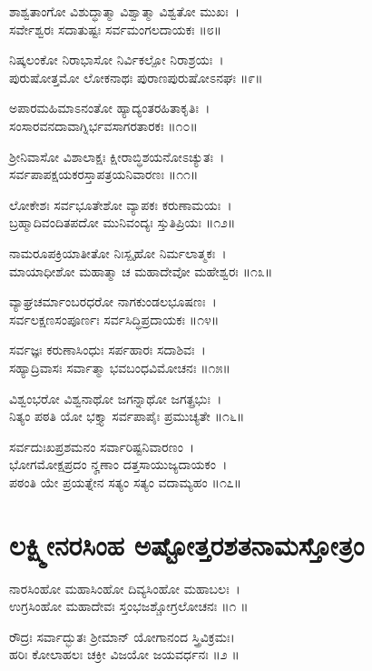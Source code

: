 ಶಾಶ್ವತಾಂಗೋ ವಿಶುದ್ಧಾತ್ಮಾ ವಿಶ್ವಾತ್ಮಾ ವಿಶ್ವತೋ ಮುಖಃ~।\\
ಸರ್ವೇಶ್ವರಃ ಸದಾತುಷ್ಟಃ ಸರ್ವಮಂಗಲದಾಯಕಃ ॥೮॥

ನಿಷ್ಕಲಂಕೋ ನಿರಾಭಾಸೋ ನಿರ್ವಿಕಲ್ಪೋ ನಿರಾಶ್ರಯಃ~।\\
ಪುರುಷೋತ್ತಮೋ ಲೋಕನಾಥಃ ಪುರಾಣಪುರುಷೋಽನಘಃ ॥೯॥

ಅಪಾರಮಹಿಮಾಽನಂತೋ ಹ್ಯಾದ್ಯಂತರಹಿತಾಕೃತಿಃ~।\\
ಸಂಸಾರವನದಾವಾಗ್ನಿರ್ಭವಸಾಗರತಾರಕಃ ॥೧೦॥

ಶ್ರೀನಿವಾಸೋ ವಿಶಾಲಾಕ್ಷಃ ಕ್ಷೀರಾಬ್ಧಿಶಯನೋಽಚ್ಯುತಃ~।\\
ಸರ್ವಪಾಪಕ್ಷಯಕರಸ್ತಾಪತ್ರಯನಿವಾರಣಃ ॥೧೧॥

ಲೋಕೇಶಃ ಸರ್ವಭೂತೇಶೋ ವ್ಯಾಪಕಃ ಕರುಣಾಮಯಃ~।\\
ಬ್ರಹ್ಮಾದಿವಂದಿತಪದೋ ಮುನಿವಂದ್ಯಃ ಸ್ತುತಿಪ್ರಿಯಃ ॥೧೨॥

ನಾಮರೂಪಕ್ರಿಯಾತೀತೋ ನಿಃಸ್ಪೃಹೋ ನಿರ್ಮಲಾತ್ಮಕಃ~।\\
ಮಾಯಾಧೀಶೋ ಮಹಾತ್ಮಾ ಚ ಮಹಾದೇವೋ ಮಹೇಶ್ವರಃ ॥೧೩॥

ವ್ಯಾಘ್ರಚರ್ಮಾಂಬರಧರೋ ನಾಗಕುಂಡಲಭೂಷಣಃ~।\\
ಸರ್ವಲಕ್ಷಣಸಂಪೂರ್ಣಃ ಸರ್ವಸಿದ್ಧಿಪ್ರದಾಯಕಃ ॥೧೪॥

ಸರ್ವಜ್ಞಃ ಕರುಣಾಸಿಂಧುಃ ಸರ್ಪಹಾರಃ ಸದಾಶಿವಃ~।\\
ಸಹ್ಯಾದ್ರಿವಾಸಃ ಸರ್ವಾತ್ಮಾ ಭವಬಂಧವಿಮೋಚನಃ ॥೧೫॥

ವಿಶ್ವಂಭರೋ ವಿಶ್ವನಾಥೋ ಜಗನ್ನಾಥೋ ಜಗತ್ಪ್ರಭುಃ~।\\
ನಿತ್ಯಂ ಪಠತಿ ಯೋ ಭಕ್ತ್ಯಾ ಸರ್ವಪಾಪೈಃ ಪ್ರಮುಚ್ಯತೇ ॥೧೬॥

ಸರ್ವದುಃಖಪ್ರಶಮನಂ ಸರ್ವಾರಿಷ್ಟನಿವಾರಣಂ~।\\
ಭೋಗಮೋಕ್ಷಪ್ರದಂ ನೄಣಾಂ ದತ್ತಸಾಯುಜ್ಯದಾಯಕಂ~।\\
ಪಠಂತಿ ಯೇ ಪ್ರಯತ್ನೇನ ಸತ್ಯಂ ಸತ್ಯಂ ವದಾಮ್ಯಹಂ ॥೧೭॥

\section{ಲಕ್ಷ್ಮೀನರಸಿಂಹ ಅಷ್ಟೋತ್ತರಶತನಾಮಸ್ತೋತ್ರಂ}

ನಾರಸಿಂಹೋ ಮಹಾಸಿಂಹೋ ದಿವ್ಯಸಿಂಹೋ ಮಹಾಬಲಃ~।\\
ಉಗ್ರಸಿಂಹೋ ಮಹಾದೇವಃ ಸ್ತಂಭಜಶ್ಚೋಗ್ರಲೋಚನಃ ॥೧ ॥

ರೌದ್ರಃ ಸರ್ವಾದ್ಭುತಃ ಶ್ರೀಮಾನ್ ಯೋಗಾನಂದ ಸ್ತ್ರಿವಿಕ್ರಮಃ।\\
ಹರಿಃ ಕೋಲಾಹಲಃ ಚಕ್ರೀ ವಿಜಯೋ ಜಯವರ್ಧನಃ ॥೨ ॥

